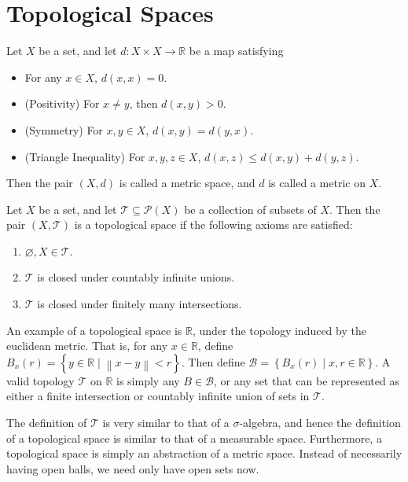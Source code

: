 \documentclass[11pt, letterpaper]{report}
\begin{document}
\chapter{Topological Spaces}
\begin{definition}\label{dfn:0}
	Let $X$ be a set, and let $d : X\times X \to \mathbb{R}$ be a map satisfying
	\begin{itemize}
		\item For any $x\in X$, $d(x,x)=0$.
		\item (Positivity) For $x\neq y$, then $d(x,y)>0$.
		\item (Symmetry) For $x,y\in X$, $d(x,y)=d(y,x)$.
		\item (Triangle Inequality) For $x,y,z\in X$, $d(x,z)\leq d(x,y)+d(y,z)$.
	\end{itemize}
	Then the pair $(X,d)$ is called a metric space, and $d$ is called a metric on $X$.
\end{definition}
\begin{definition}\label{dfn:1}
	Let $X$ be a set, and let $\mathcal{T} \subseteq \mathcal{P} (X)$ be a collection of subsets of $X$. Then the pair $(X,\mathcal{T} )$ is a topological space if the following axioms are satisfied:
	\begin{enumerate}
		\item $\varnothing,X\in \mathcal{T} $.
		\item $\mathcal{T} $ is closed under countably infinite unions.
		\item $\mathcal{T} $ is closed under finitely many intersections.
	\end{enumerate}
\end{definition}
An example of a topological space is $\mathbb{R}$, under the topology induced by the euclidean metric. That is, for any $x\in\mathbb{R}$, define $B_x(r)=\left\{ y\in\mathbb{R} \mid \left\lVert x-y \right\rVert <r \right\} $. Then define $\mathcal{B} =\left\{ B_x(r) \mid x,r\in\mathbb{R} \right\} $. A valid topology $\mathcal{T} $ on $\mathbb{R}$ is simply any $B\in \mathcal{B} $, or any set that can be represented as either a finite intersection or countably infinite union of sets in $\mathcal{T} $.
\begin{remark}
	The definition of $\mathcal{T} $ is very similar to that of a $\sigma $-algebra, and hence the definition of a topological space is similar to that of a measurable space. Furthermore, a topological space is simply an abstraction of a metric space. Instead of necessarily having open balls, we need only have open sets now.
\end{remark}
\end{document}
